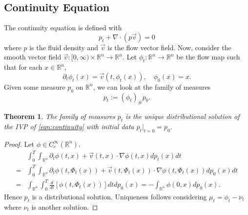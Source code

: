 \documentclass[12pt]{article}
\theoremstyle{plain}
\newtheorem{thm}{Theorem}[section]
\numberwithin{equation}{section}
\begin{document}
\subsection{Continuity Equation}
The continuity equation is defined with 
\begin{equation}\label{eqn:continuity}p_t + \nabla \cdot (p\vec{v}) = 0\end{equation}
where $p$ is the fluid density and $\vec{v}$ is the flow vector field.\newline
Now, consider the smooth vector field $\vec{v}: [0,\infty)\times \mathbb{R}^n\to \mathbb{R}^n.$
Let $\phi_t: \mathbb{R}^n\to \mathbb{R}^n$ be the flow map such that for each $x\in \mathbb{R}^n$,
\[\partial_t\phi_t(x) = \vec{v}(t,\phi_t(x)),\quad \phi_0(x) = x.\]
Given some measure $p_0$ on $\mathbb{R}^n$, we can look at the family of measures 
\[p_t := (\phi_t)_\# p_0.\]
\begin{thm}
	The family of measures $p_t$ is the unique distributional solution of the IVP of \eqref{eqn:continuity} with initial data $p_t\vert_{t=0} = p_0$.
\end{thm}
\begin{proof}
	Let $\phi\in C^\infty_c(\mathbb{R}^n)$.
	\begin{align*}
		&\int_0^T \int_{\mathbb{R}^n}\partial_t\phi(t,x) + \vec{v}(t,x)\cdot \nabla\phi(t,x)dp_t(x)dt\\
	  = &\int_0^T\int_{\mathbb{R}^n}\partial_t\phi(t,\Phi_t(x)) + \vec{v}(t,\Phi_t(x))\cdot \nabla\phi(t,\Phi_t(x))dp_0(x)dt \\
	  = &\int_{\mathbb{R}^n}\int_0^T \frac{d}{dt}[\phi(t,\Phi_t(x))]dtdp_0(x) = - \int_{\mathbb{R}^n}\phi(0,x)dp_0(x).
	\end{align*}
	Hence $p_t$ is a distributional solution. Uniqueness follows considering $\mu_t = \phi_t-\nu_t$ where $\nu_t$ is another solution.
\end{proof}
\end{document}

